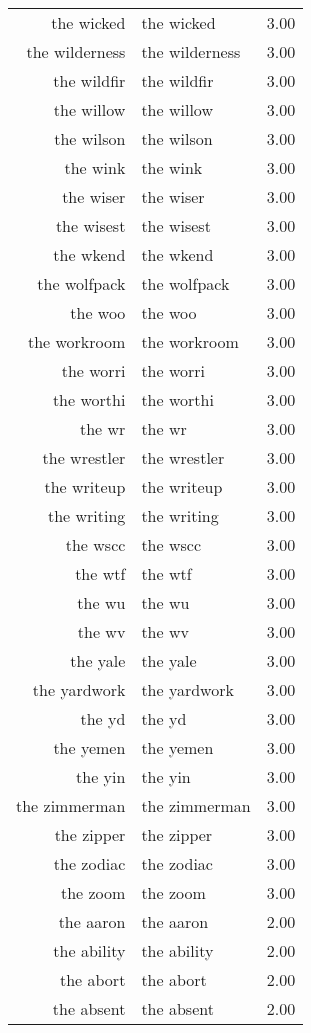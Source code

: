 \begin{table}[ht]
\begin{tabular}{rlr}
  the wicked & the wicked & 3.00 \\ 
  the wilderness & the wilderness & 3.00 \\ 
  the wildfir & the wildfir & 3.00 \\ 
  the willow & the willow & 3.00 \\ 
  the wilson & the wilson & 3.00 \\ 
  the wink & the wink & 3.00 \\ 
  the wiser & the wiser & 3.00 \\ 
  the wisest & the wisest & 3.00 \\ 
  the wkend & the wkend & 3.00 \\ 
  the wolfpack & the wolfpack & 3.00 \\ 
  the woo & the woo & 3.00 \\ 
  the workroom & the workroom & 3.00 \\ 
  the worri & the worri & 3.00 \\ 
  the worthi & the worthi & 3.00 \\ 
  the wr & the wr & 3.00 \\ 
  the wrestler & the wrestler & 3.00 \\ 
  the writeup & the writeup & 3.00 \\ 
  the writing & the writing & 3.00 \\ 
  the wscc & the wscc & 3.00 \\ 
  the wtf & the wtf & 3.00 \\ 
  the wu & the wu & 3.00 \\ 
  the wv & the wv & 3.00 \\ 
  the yale & the yale & 3.00 \\ 
  the yardwork & the yardwork & 3.00 \\ 
  the yd & the yd & 3.00 \\ 
  the yemen & the yemen & 3.00 \\ 
  the yin & the yin & 3.00 \\ 
  the zimmerman & the zimmerman & 3.00 \\ 
  the zipper & the zipper & 3.00 \\ 
  the zodiac & the zodiac & 3.00 \\ 
  the zoom & the zoom & 3.00 \\ 
  the aaron & the aaron & 2.00 \\ 
  the ability & the ability & 2.00 \\ 
  the abort & the abort & 2.00 \\ 
  the absent & the absent & 2.00 \\ 

\end{tabular}
\end{table}
